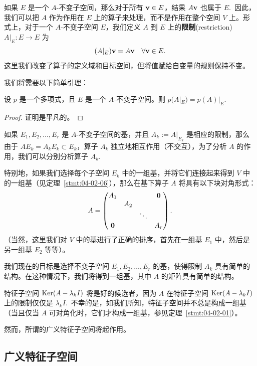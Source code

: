 

如果 $E$ 是一个 $A$-不变子空间，那么对于所有 $\mathbf{v} \in E$，结果 $A\mathbf{v}$ 也属于 $E$.~因此，我们可以把 $A$ 作为作用在 $E$ 上的算子来处理，而不是作用在整个空间 $V$ 上。形式上，对于一个 $A$-不变子空间 $E$，我们定义 $A$ 到 $E$ 上的\textbf{限制}(restriction)
$A|_E : E \to E$ 为
$$(A|_E)\mathbf{v} = A\mathbf{v} \quad \forall \mathbf{v} \in E.$$
这里我们改变了算子的定义域和目标空间，但将值赋给自变量的规则保持不变。

我们将需要以下简单引理：

\begin{lemma}\label{stmt:09-03-01}
设 $p$ 是一个多项式，且 $E$ 是一个 $A$-不变子空间。则 $p(A|_E) = p(A)|_E$.~\end{lemma}

\begin{proof} 证明是平凡的。\end{proof}

如果 $E_1, E_2, \dots, E_r$ 是 $A$-不变子空间的基，并且 $A_k := A|_{E_k}$ 是相应的限制，那么由于 $AE_k = A_k E_k \subset E_k$，算子 $A_k$ 独立地相互作用（不交互），为了分析 $A$ 的作用，我们可以分别分析算子 $A_k$.~

特别地，如果我们选择每个子空间 $E_k$ 中的一组基，并将它们连接起来得到 $V$ 中的一组基（见定理~\ref{stmt:04-02-06}），那么在基下算子 $A$ 将具有以下块对角形式：
$$A = \begin{pmatrix} A_1 & & & \mathbf{0} \\ & A_2 & & \\ & & \ddots & \\ \mathbf{0} & & & A_r \end{pmatrix}.$$
（当然，这里我们对 $V$ 中的基进行了正确的排序，首先在一组基 $E_1$ 中，然后是另一组基 $E_2$ 等等）。

我们现在的目标是选择不变子空间 $E_1, E_2, \dots, E_r$ 的基，使得限制 $A_k$ 具有简单的结构。在这种情况下，我们将得到一组基，其中 $A$ 的矩阵具有简单的结构。

特征子空间 $\operatorname{Ker}(A - \lambda_k I)$ 将是好的候选者，因为 $A$ 在特征子空间 $\operatorname{Ker}(A - \lambda_k I)$ 上的限制仅仅是 $\lambda_k I$.~不幸的是，如我们所知，特征子空间并不总是构成一组基（当且仅当 $A$ 可对角化时，它们才构成一组基，参见定理~\ref{stmt:04-02-01}）。

然而，所谓的广义特征子空间将起作用。

\subsection{广义特征子空间}\label{sec:09-03-02}

